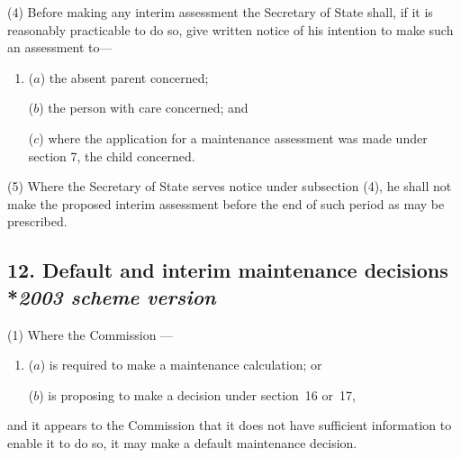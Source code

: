 \documentclass[12pt,a4paper]{article}
\begin{document}
(4) Before making any interim assessment 
the Secretary of State  %
shall, if it is reasonably practicable to do so, give written notice of his intention to make such an assessment to—
\begin{enumerate}\item[]
($a$) the absent parent concerned;

($b$) the person with care concerned; and

($c$) where the application for a maintenance assessment was made under section 7, the child concerned.
\end{enumerate}

(5) Where 
the Secretary of State  %
serves notice under subsection (4), he shall not make the proposed interim assessment before the end of such period as may be prescribed.


\subsection[12. Default and interim maintenance decisions --- \emph{2003 scheme version}]{12. Default and interim maintenance decisions\\*\emph{2003 scheme version}}

(1) Where the 
Commission%
—
\begin{enumerate}\item[]
($a$) is required to make a maintenance calculation; or

($b$) is proposing to make a decision under section~16 or~17,
\end{enumerate}
and it appears to 
the Commission  %
that 
it  %
does not have sufficient information to enable 
it  %
to do so, 
it  %
may make a default maintenance decision.
\end{document}
